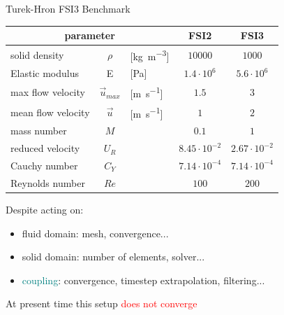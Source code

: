 \documentclass[10pt,t]{beamer}
\begin{document}
\begin{frame}{Turek-Hron FSI3 Benchmark}

\footnotesize
\begin{center}
\begin{tabular}{ l c l | c | c } 
	\multicolumn{3}{c|}{parameter} & FSI2 & FSI3   \\ 
	\hline
	solid density  &  $\rho$ & [\si{kg.m^{-3}}] & $10000$ & $1000$     \\
	Elastic modulus  & E & [\si{Pa}] & $1.4\cdot 10^6$ & $5.6\cdot 10^6$   \\
	max flow velocity & $\vec{u}_{max}$ & [\si{m.s^{-1}}] & $1.5$ & $3$ \\
	mean flow velocity & $\vec{u}$ & [\si{m.s^{-1}}] & $1$ & $2$  \\
    \hline
    mass number  &  $M$ & & \cellcolor{red!10} $0.1$ & \cellcolor{red!10} $1$     \\
	reduced velocity & $U_R$ & & $8.45 \cdot 10^{-2}$  & $2.67\cdot 10^{-2}$  \\
	Cauchy number  & $C_Y$ & & \cellcolor{yellow!25}  $7.14\cdot 10^{-4}$  & \cellcolor{yellow!25} $7.14\cdot 10^{-4}$  \\
	Reynolds number & $Re$ & & $100$ & $200$ \\
\end{tabular}    
\end{center}
\normalsize
\vspace{0.5cm}
Despite acting on:
\begin{itemize}
    \item \textcolor{pblue}{fluid domain}: mesh, convergence...
    \item \textcolor{dorange}{solid domain}: number of elements, solver...
    \item \textcolor{teal}{coupling}: convergence, timestep extrapolation, filtering...
\end{itemize}
\vspace{0.5cm}
\large
At present time this setup \textcolor{red}{does not converge}
    
\end{frame}
\end{document}
